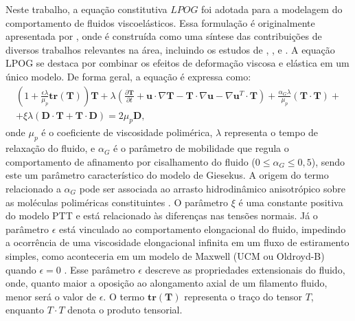Neste trabalho, a equação constitutiva $LPOG$ foi adotada para a modelagem do comportamento de fluidos viscoelásticos. Essa formulação é originalmente apresentada por , onde é construída como uma síntese das contribuições de diversos trabalhos relevantes na área, incluindo os estudos de , ,  e . A equação LPOG se destaca por combinar os efeitos de deformação viscosa e elástica em um único modelo. De forma geral, a equação é expressa como:
\begin{equation}
    \begin{split}
        \left( 1 + \frac{\epsilon \lambda}{\mu_p} \textbf{tr}(\mathbf{T}) \right) \mathbf{T} + \lambda \left(\frac{\partial \mathbf{T}}{\partial t} + \mathbf{u} \cdot \nabla \mathbf{T} - \mathbf{T} \cdot\nabla \mathbf{u} - \nabla \mathbf{u}^T \cdot \mathbf{T} \right) + \frac{\alpha_G \lambda}{\mu_p} (\mathbf{T} \cdot \mathbf{T}) + \\ + \xi\lambda (\mathbf{D} \cdot \mathbf{T} + \mathbf{T} \cdot \mathbf{D}) = 2 \mu_p \mathbf{D},
    \end{split}\label{eq_tensores_lpog}
\end{equation}
onde $\mu_p$ é o coeficiente de viscosidade polimérica, $\lambda$ representa o tempo de relaxação do fluido, e $\alpha_G$ é o parâmetro de mobilidade que regula o comportamento de afinamento por cisalhamento do fluido ($0 \leq \alpha_G \leq 0,5$), sendo este um parâmetro característico do modelo de Giesekus. A origem do termo relacionado a $\alpha_G$  pode ser associada ao arrasto hidrodinâmico anisotrópico sobre as moléculas poliméricas constituintes \cite{bird_v1_1987}. O parâmetro $\xi$ é uma constante positiva do modelo PTT e está relacionado às diferenças nas tensões normais. Já o parâmetro $\epsilon$ está vinculado ao comportamento elongacional do fluido, impedindo a ocorrência de uma viscosidade elongacional infinita em um fluxo de estiramento simples, como aconteceria em um modelo de Maxwell (UCM ou Oldroyd-B) quando $\epsilon = 0$ \cite{pinho2000axial}. Esse parâmetro $\epsilon$ descreve as propriedades extensionais do fluido, onde, quanto maior a oposição ao alongamento axial de um filamento fluido, menor será o valor de $\epsilon$. O termo $\textbf{tr}(\mathbf{T})$ representa o traço do tensor $T$, enquanto $T\cdot T$ denota o produto tensorial.

